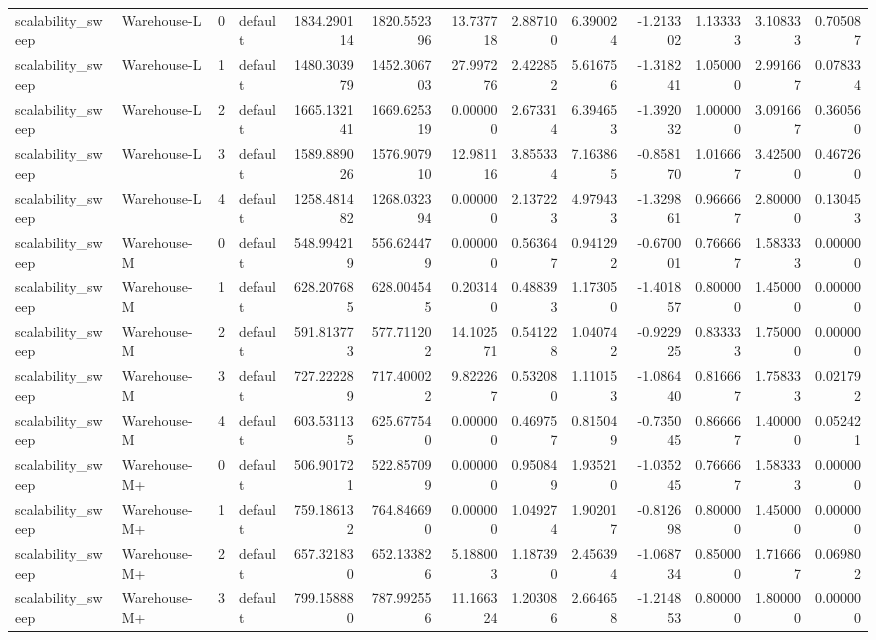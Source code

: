 \begin{tabular}{llrlrrrrrrrrr}
scalability\_sweep & Warehouse-L & 0 & default & 1834.290114 & 1820.552396 & 13.737718 & 2.887100 & 6.390024 & -1.213302 & 1.133333 & 3.108333 & 0.705087 \\
scalability\_sweep & Warehouse-L & 1 & default & 1480.303979 & 1452.306703 & 27.997276 & 2.422852 & 5.616756 & -1.318241 & 1.050000 & 2.991667 & 0.078334 \\
scalability\_sweep & Warehouse-L & 2 & default & 1665.132141 & 1669.625319 & 0.000000 & 2.673314 & 6.394653 & -1.392032 & 1.000000 & 3.091667 & 0.360560 \\
scalability\_sweep & Warehouse-L & 3 & default & 1589.889026 & 1576.907910 & 12.981116 & 3.855334 & 7.163865 & -0.858170 & 1.016667 & 3.425000 & 0.467260 \\
scalability\_sweep & Warehouse-L & 4 & default & 1258.481482 & 1268.032394 & 0.000000 & 2.137223 & 4.979433 & -1.329861 & 0.966667 & 2.800000 & 0.130453 \\
scalability\_sweep & Warehouse-M & 0 & default & 548.994219 & 556.624479 & 0.000000 & 0.563647 & 0.941292 & -0.670001 & 0.766667 & 1.583333 & 0.000000 \\
scalability\_sweep & Warehouse-M & 1 & default & 628.207685 & 628.004545 & 0.203140 & 0.488393 & 1.173050 & -1.401857 & 0.800000 & 1.450000 & 0.000000 \\
scalability\_sweep & Warehouse-M & 2 & default & 591.813773 & 577.711202 & 14.102571 & 0.541228 & 1.040742 & -0.922925 & 0.833333 & 1.750000 & 0.000000 \\
scalability\_sweep & Warehouse-M & 3 & default & 727.222289 & 717.400022 & 9.822267 & 0.532080 & 1.110153 & -1.086440 & 0.816667 & 1.758333 & 0.021792 \\
scalability\_sweep & Warehouse-M & 4 & default & 603.531135 & 625.677540 & 0.000000 & 0.469757 & 0.815049 & -0.735045 & 0.866667 & 1.400000 & 0.052421 \\
scalability\_sweep & Warehouse-M+ & 0 & default & 506.901721 & 522.857099 & 0.000000 & 0.950849 & 1.935210 & -1.035245 & 0.766667 & 1.583333 & 0.000000 \\
scalability\_sweep & Warehouse-M+ & 1 & default & 759.186132 & 764.846690 & 0.000000 & 1.049274 & 1.902017 & -0.812698 & 0.800000 & 1.450000 & 0.000000 \\
scalability\_sweep & Warehouse-M+ & 2 & default & 657.321830 & 652.133826 & 5.188003 & 1.187390 & 2.456394 & -1.068734 & 0.850000 & 1.716667 & 0.069802 \\
scalability\_sweep & Warehouse-M+ & 3 & default & 799.158880 & 787.992556 & 11.166324 & 1.203086 & 2.664658 & -1.214853 & 0.800000 & 1.800000 & 0.000000 \\

\end{tabular}
